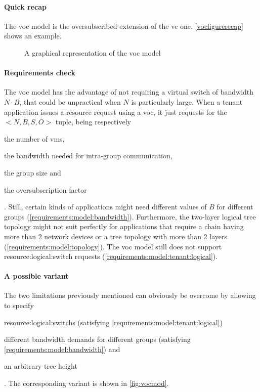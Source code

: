 \paragraph{Quick recap}
The \gls{voc} model is the oversubscribed extension of the \gls{vc} one.
\autoref{vocfigurerecap} shows an example.

\begin{figure}[!htb]
    \centering
    \usebox{\vocfigure}
    \caption{A graphical representation of the \gls{voc} model}
    \label{vocfigurerecap}
\end{figure}

\paragraph{Requirements check}
The \gls{voc} model has the advantage of not requiring a virtual switch of bandwidth $N \cdot B$, that could be unpractical when $N$ is particularly large.
When a tenant application issues a resource request using a \gls{voc}, it just requests for the $<N, B, S, O>$ tuple, being respectively
\begin{mylist}
    \item the number of \glspl{vm},
    \item the bandwidth needed for intra-group communication,
    \item the group size and
    \item the oversubscription factor
\end{mylist}.
Still, certain kinds of applications might need different values of $B$ for different groups (\xmark \ref{requirements:model:bandwidth}).
Furthermore, the two-layer logical tree topology might not suit perfectly for applications that require a chain having more than 2 network devices or a tree topology with more than 2 layers (\xmark \ref{requirements:model:topology}).
The \gls{voc} model still does not support \gls{resource:logical:switch} requests (\xmark \ref{requirements:model:tenant:logical}).

\paragraph{A possible variant}
The two limitations previously mentioned can obviously be overcome by allowing to specify
\begin{mylist}
    \item \glspl{resource:logical:switch} (satisfying \cmark \ref{requirements:model:tenant:logical})
    \item different bandwidth demands for different groups (satisfying \cmark \ref{requirements:model:bandwidth}) and
    \item an arbitrary tree height
\end{mylist}.
The corresponding variant is shown in \autoref{fig:vocmod}.

